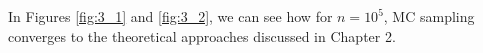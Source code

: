 In Figures \ref{fig:3_1} and \ref{fig:3_2}, we can see how for $n=10^5$, MC sampling converges to the theoretical approaches discussed in Chapter 2.
% 
% 
% 
% 
% 


% 
% 
% 
% 
% 
% 
% 
% 
% 
% 
% 


